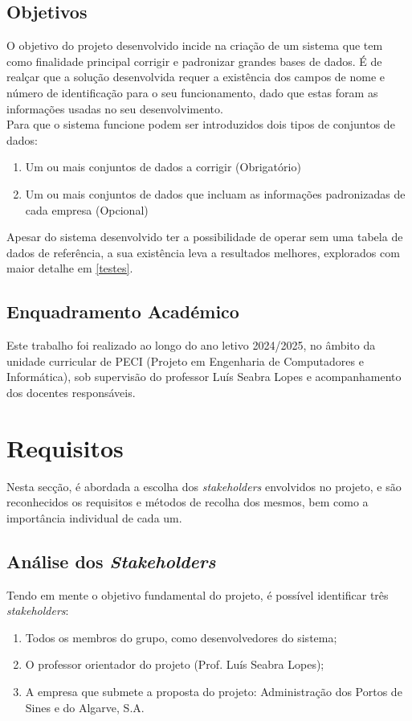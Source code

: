 \documentclass[a4paper,12pt]{article}
\begin{document}
\subsection{Objetivos}
O objetivo do projeto desenvolvido incide na criação de um sistema que tem como finalidade principal corrigir e padronizar grandes bases de dados. É de realçar que a solução desenvolvida requer a existência dos campos de nome e número de identificação para o seu funcionamento, dado que estas foram as informações usadas no seu desenvolvimento.
\\
Para que o sistema funcione podem ser introduzidos dois tipos de conjuntos de dados:
\begin{enumerate}
    \item Um ou mais conjuntos de dados a corrigir (Obrigatório)
    \item Um ou mais conjuntos de dados que incluam as informações padronizadas de cada empresa (Opcional)
\end{enumerate}
Apesar do sistema desenvolvido ter a possibilidade de operar sem uma tabela de dados de referência, a sua existência leva a resultados melhores, explorados com maior detalhe em \ref{testes}.

\subsection{Enquadramento Académico}
Este trabalho foi realizado ao longo do ano letivo 2024/2025, no âmbito da unidade curricular de PECI (Projeto em Engenharia de Computadores e Informática), sob supervisão do professor Luís Seabra Lopes e acompanhamento dos docentes responsáveis.

\section{Requisitos}
Nesta secção, é abordada a escolha dos \textit{stakeholders} envolvidos no projeto, e são reconhecidos os requisitos e métodos de recolha dos mesmos, bem como a importância individual de cada um.

\subsection{Análise dos \textit{Stakeholders}}
Tendo em mente o objetivo fundamental do projeto, é possível identificar três \textit{stakeholders}:
\begin{enumerate}
    \item Todos os membros do grupo, como desenvolvedores do sistema;
    \item O professor orientador do projeto (Prof. Luís Seabra Lopes);
    \item A empresa que submete a proposta do projeto:  Administração dos Portos de Sines e do Algarve, S.A.
\end{enumerate}
\end{document}
